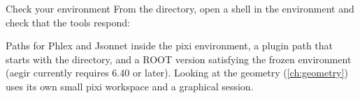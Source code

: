 \begin{exercise}{Check your environment}
From the  directory, open a shell in the environment and check
that the tools respond:
\end{exercise}

\begin{checkpoint}
Paths for Phlex and Jsonnet inside the pixi environment, a plugin path that starts with the
 directory, and a ROOT version satisfying the frozen environment (aegir currently requires
6.40 or later). Looking at the geometry (\cref{ch:geometry}) uses its own
small pixi workspace and a graphical session.
\end{checkpoint}
